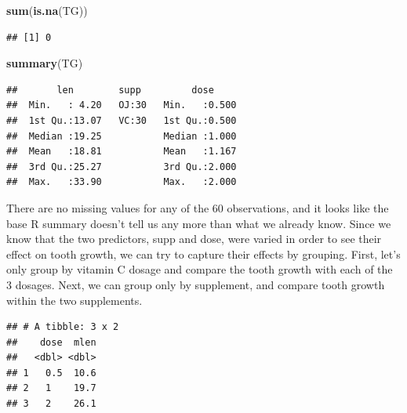 \documentclass[
]{article}
\newenvironment{Shaded}{\begin{snugshade}}{\end{snugshade}}
\newcommand{\DataTypeTok}[1]{\textcolor[rgb]{0.13,0.29,0.53}{#1}}
\newcommand{\KeywordTok}[1]{\textcolor[rgb]{0.13,0.29,0.53}{\textbf{#1}}}
\newcommand{\NormalTok}[1]{#1}
\newcommand{\OperatorTok}[1]{\textcolor[rgb]{0.81,0.36,0.00}{\textbf{#1}}}
\newcommand{\StringTok}[1]{\textcolor[rgb]{0.31,0.60,0.02}{#1}}
\begin{document}
\begin{Shaded}
\begin{Highlighting}[]
\KeywordTok{sum}\NormalTok{(}\KeywordTok{is.na}\NormalTok{(TG))}
\end{Highlighting}
\end{Shaded}

\begin{verbatim}
## [1] 0
\end{verbatim}

\begin{Shaded}
\begin{Highlighting}[]
\KeywordTok{summary}\NormalTok{(TG)}
\end{Highlighting}
\end{Shaded}

\begin{verbatim}
##       len        supp         dose      
##  Min.   : 4.20   OJ:30   Min.   :0.500  
##  1st Qu.:13.07   VC:30   1st Qu.:0.500  
##  Median :19.25           Median :1.000  
##  Mean   :18.81           Mean   :1.167  
##  3rd Qu.:25.27           3rd Qu.:2.000  
##  Max.   :33.90           Max.   :2.000
\end{verbatim}

There are no missing values for any of the 60 observations, and it looks
like the base R summary doesn't tell us any more than what we already
know. Since we know that the two predictors, supp and dose, were varied
in order to see their effect on tooth growth, we can try to capture
their effects by grouping. First, let's only group by vitamin C dosage
and compare the tooth growth with each of the 3 dosages. Next, we can
group only by supplement, and compare tooth growth within the two
supplements.

\begin{Shaded}
\end{Shaded}

\begin{verbatim}
## # A tibble: 3 x 2
##    dose  mlen
##   <dbl> <dbl>
## 1   0.5  10.6
## 2   1    19.7
## 3   2    26.1
\end{verbatim}
\end{document}
